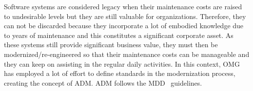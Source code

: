 
Software systems are considered legacy when their maintenance costs are raised to undesirable levels but they are still valuable for organizations. Therefore, they can not be discarded because they incorporate a lot of embodied knowledge due to years of maintenance and this constitutes a significant corporate asset. As these systems still provide significant business value, they must then be modernized/re-engineered so that their maintenance costs can be manageable and they can keep on assisting in the regular daily activities. In this context, OMG has employed a lot of effort to define standards in the modernization process, creating the concept of ADM. ADM follows the MDD~\cite{5440163} guidelines.



